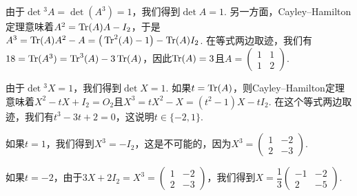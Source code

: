 \begin{solution}
  由于$\det{}^3A=\det(A^3)=1$，我们得到$\det A=1$. 另一方面，Cayley--Hamilton定理意味着$A^2=\operatorname{Tr}(A)A-I_2$，于是$A^3=\operatorname{Tr}(A)A^2-A=\big(\operatorname{Tr}^2(A)-1\big)-\operatorname{Tr}(A)I_2$. 在等式两边取迹，我们有$18=\operatorname{Tr}(A^3)=\operatorname{Tr}^3(A)-3\operatorname{Tr}(A)$，因此$\operatorname{Tr}(A)=3$且$A=\begin{pmatrix}
    1 & 1 \\
    1 & 2
  \end{pmatrix}$.
\end{solution}

\begin{solution}
  由于$\det{}^3X=1$，我们得到$\det X=1$. 如果$t=\operatorname{Tr}(A)$，则Cayley--Hamilton定理意味着$X^2-tX+I_2=O_2$且$X^3=tX^2-X=(t^2-1)X-tI_2$. 在这个等式两边取迹，我们有$t^3-3t+2=0$，这说明$t\in\{-2,1\}$.

  如果$t=1$，我们得到$X^3=-I_2$，这是不可能的，因为$X^3=\begin{pmatrix}
    1 & -2 \\
    2 & -3
  \end{pmatrix}$.

  如果$t=-2$，由于$3X+2I_2=X^3=\begin{pmatrix}
    1 & -2 \\
    2 & -3
  \end{pmatrix}$，我们得到$X=\dfrac13\begin{pmatrix}
    -1 & -2 \\
    2 & -5
  \end{pmatrix}$.
\end{solution}

